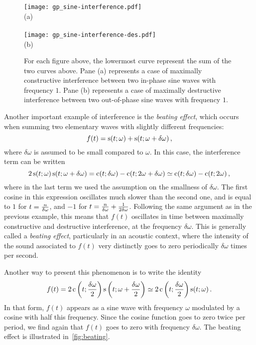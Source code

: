 \begin{figure}[ph!]
  \centering
  \texttt{[image: gp\_sine-interference.pdf]}
  \\\hspace{0.7cm}(a)\\~\\
  \texttt{[image: gp\_sine-interference-des.pdf]}
  \\\hspace{0.7cm}(b)\\
  \caption{For each figure above, the lowermost curve represent the sum of the two curves above. Pane (a) represents a case of maximally constructive interference between two in-phase sine waves with frequency $1$. Pane (b) represents a case of maximally destructive interference between two out-of-phase sine waves with frequency $1$.}
  \label{fig:interference}
\end{figure}
\begin{example}
  Another important example of interference is the \emph{beating effect}, which occurs when summing two elementary waves with slightly different frequencies:
  \begin{equation}
    f(t)=\operatorname{s}(t;\omega)+\operatorname{s}(t;\omega+\delta\omega)\,,
  \end{equation}
  where $\delta\omega$ is assumed to be small compared to $\omega$.
  In this case, the interference term can be written
  \begin{equation}
    2\operatorname{s}(t;\omega)\operatorname{s}(t;\omega+\delta\omega)=\operatorname{c}(t;\delta\omega)-\operatorname{c}(t;2\omega+\delta\omega)
    \simeq \operatorname{c}(t;\delta\omega)-\operatorname{c}(t;2\omega)\,,
  \end{equation}
  where in the last term we used the assumption on the smallness of $\delta\omega$. The first cosine in this expression oscillates much slower than the second one, and is equal to $1$ for $t=\smash{\frac{n}{\delta\omega}}$, and $-1$ for $t=\smash{\frac{n}{\delta\omega}+\frac{1}{2\delta\omega}}$. Following the same argument as in the previous example, this means that $f(t)$ oscillates in time between maximally constructive and destructive interference, at the frequency $\delta\omega$. This is generally called a \emph{beating effect}, particularly in an acoustic context, where the intensity of the sound associated to $f(t)$ very distinctly goes to zero periodically $\delta\omega$ times per second.

  Another way to present this phenomenon is to write the identity
  \begin{equation}
    f(t)=2\operatorname{c}\left(t;\frac{\delta\omega}{2}\right)\operatorname{s}\left(t;\omega+\frac{\delta\omega}{2}\right)
    \simeq 2\operatorname{c}\left(t;\frac{\delta\omega}{2}\right)\operatorname{s}(t;\omega)\,.
  \end{equation}
  In that form, $f(t)$ appears as a sine wave with frequency $\omega$ modulated by a cosine with half this frequency. Since the cosine function goes to zero twice per period, we find again that $f(t)$ goes to zero with frequency $\delta\omega$. The beating effect is illustrated in~\cref{fig:beating}.
\end{example}
